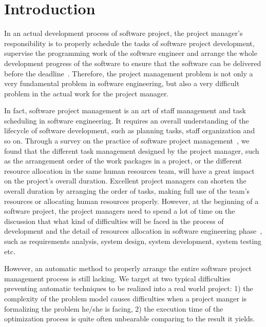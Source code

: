 
\section{Introduction}

%
In an actual
development process of software project, the project manager's responsibility is
to properly schedule the tasks of software project development, supervise the
programming work of the software engineer and arrange the whole development
progress of the software to ensure that the software can be delivered before the
deadline~\cite{stellman}. 
Therefore, the project management problem is not only
a very fundamental problem in software engineering, but also a very difficult
problem in the actual work for the project manager.

In fact, software project management is an art of staff management and task scheduling in software engineering. It requires an overall understanding of the lifecycle of software development, such as planning tasks, staff organization and so on. 
Through a survey on the practice of software project management~\cite{chang,alba,ren,penta}, we found that the different task management designed by the project manager, such as  the arrangement order of the work packages in a project, or the different  resource allocation in the same human resources team, will have a great  impact on the project's overall duration.
Excellent project managers can  shorten the overall duration by arranging the order of tasks, making full use  of the team's resources or allocating human resources properly. However, at the beginning of a software project, the project managers need to spend a lot  of time on the discussion that what kind of difficulties will be faced in the process of development and the detail of resources allocation in  software engineering phase~\cite{pentico}, such as requirements analysis, system design, system development, system testing etc. 

However, an automatic method to properly arrange the entire software project management process is still lacking. 
We target at two typical difficulties preventing automatic techniques to be realized into a real world project: 
1) the complexity of the problem model causes difficulties when a project manger is formalizing the problem he\slash she is facing, 
2) the execution time of the optimization process is quite often unbearable comparing to the result it yields. 

